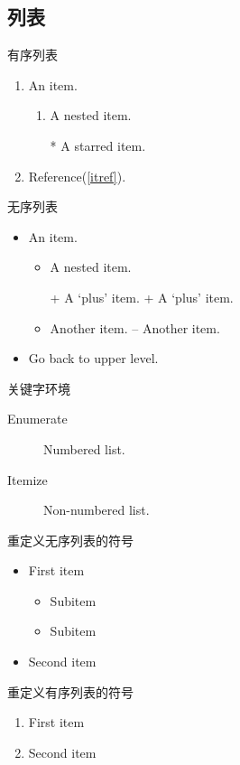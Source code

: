 \documentclass[a4paper]{ctexart}
\begin{document}
    \subsection{列表}
    有序列表
    \begin{enumerate}
        \item An item.
        \begin{enumerate}
            \item A nested item.\label{itref}
            \item[*] A starred item.
        \end{enumerate}
        \item Reference(\ref{itref}).
    \end{enumerate}
    无序列表
    \begin{itemize}
        \item An item.
        \begin{itemize}
            \item A nested item.
            \item[+] A `plus' item. + A ‘plus’ item.
            \item Another item. – Another item.
        \end{itemize}
        \item Go back to upper level.
    \end{itemize}
    关键字环境
    \begin{description}
        \item[Enumerate] Numbered list.
        \item[Itemize] Non-numbered list.
    \end{description}
    重定义无序列表的符号
    \renewcommand{\labelitemi}{\dag}
    \renewcommand{\labelitemii}{\ddag}
    \begin{itemize}
        \item First item
        \begin{itemize} 
            \item Subitem
            \item Subitem
        \end{itemize}
        \item Second item
    \end{itemize}
    重定义有序列表的符号
    \renewcommand{\labelenumi}{\Alph{enumi}>}
    \begin{enumerate}
        \item First item
        \item Second item
    \end{enumerate}
\end{document}

